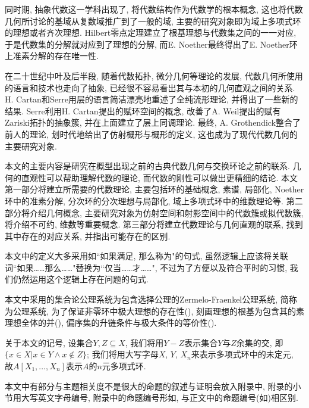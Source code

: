 同时期, 抽象代数这一学科出现了, 将代数结构作为代数学的根本概念, 这也将代数几何所讨论的基域从复数域推广到了一般的域, 主要的研究对象即为域上多项式环的理想或者齐次理想. Hilbert零点定理建立了根基理想与代数集之间的一一对应, 于是代数集的分解就对应到了理想的分解, 而E. Noether最终得出了E. Noether环上准素分解的存在唯一性.

在二十世纪中叶及后半段, 随着代数拓扑, 微分几何等理论的发展, 代数几何所使用的语言和技术也走向了抽象, 已经很不容易看出其与本初的几何直观之间的关系. H. Cartan和Serre用层的语言简洁漂亮地重述了全纯流形理论, 并得出了一些新的结果. Serre利用H. Cartan提出的赋环空间的概念, 改善了A. Weil提出的赋有Zariski拓扑的抽象簇, 并在上面建立了层上同调理论. 最终, A. Grothendick整合了前人的理论, 划时代地给出了仿射概形与概形的定义, 这也成为了现代代数几何的主要研究对象.

本文的主要内容是研究在概型出现之前的古典代数几何与交换环论之前的联系. 几何的直观性可以帮助理解代数的理论, 而代数的刚性可以做出更精细的结论. 本文第一部分将建立所需要的代数理论, 主要包括环的基础概念, 素谱, 局部化, Noether环中的准素分解, 分次环的分次理想与局部化, 域上多项式环中的维数理论等. 第二部分将介绍几何概念, 主要研究对象为仿射空间和射影空间中的代数簇或拟代数簇, 将介绍不可约, 维数等重要概念. 第三部分将建立代数理论与几何直观的联系, 找到其中存在的对应关系, 并指出可能存在的区别.

本文中的定义大多采用如``如果满足, 那么称为"的句式, 虽然逻辑上应该将关联词``如果\dots\dots 那么\dots\dots"替换为``仅当\dots\dots 才\dots\dots ", 不过为了方便以及符合平时的习惯, 我们仍然运用这个逻辑上存在问题的句式.%

本文中采用的集合论公理系统为包含选择公理的Zermelo-Fraenkel公理系统, 简称为公理系统, 为了保证非零环中极大理想的存在性(), 刻画理想的根基为包含其的素理想全体的并(), 偏序集的升链条件与极大条件的等价性().

关于本文的记号, 设集合$Y, Z\subseteq X$, 我们将用$Y-Z$表示集合$Y$与$Z$余集的交, 即$\{x\in X\vert x\in Y\wedge x\notin Z\}$; 我们将用大写字母$X$, $Y$, $X_n$来表示多项式环中的未定元, 故$A[X_1, \dotsc, X_n]$表示$A$的$n$元多项式环.%

本文中有部分与主题相关度不是很大的命题的叙述与证明会放入附录中, 附录的小节用大写英文字母编号, 附录中的命题编号形如, 与正文中的命题编号(如)相区别.

